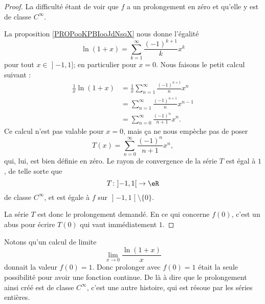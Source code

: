 \begin{proof}
	La difficulté étant de voir que \( f\) a un prolongement en zéro et qu'elle y est de classe \(  C^{\infty}\).

	La proposition \ref{PROPooKPBIooJdNsqX} nous donne l'égalité
	\begin{equation}
		\ln(1+x)=\sum_{k=1}^{\infty}\frac{ (-1)^{k+1} }{ k }x^k
	\end{equation}
	pour tout \( x\in \mathopen] -1 , 1 \mathclose]\); en particulier pour \( x=0\). Nous faisons le petit calcul suivant :
	\begin{subequations}        \label{SUBEQooRLQOooEzNFDp}
		\begin{align}
			\frac{1}{ x }\ln(1+x) & = \frac{1}{ x }\sum_{n=1}^{\infty}\frac{ (-1)^{n+1} }{ n }x^n \\
			                      & =\sum_{n=1}^{\infty}\frac{ (-1)^{n+1} }{ n }x^{n-1}           \\
			                      & =\sum_{n=0}^{\infty}\frac{ (-1)^n }{ n+1 }x^n.
		\end{align}
	\end{subequations}
	Ce calcul n'est pas valable pour \( x=0\), mais ça ne nous empèche pas de poser
	\begin{equation}
		T(x)=\sum_{n=0}^{\infty}\frac{ (-1)^n }{ n+1 }x^n,
	\end{equation}
	qui, lui, est bien définie en zéro. Le rayon de convergence de la série \( T\) est égal à \( 1\), de telle sorte que
	\begin{equation}
		T\colon \mathopen] -1 , 1 \mathclose[\to \eR \\
	\end{equation}
	de classe \(  C^{\infty}\), et est égale à \( f\) sur \( \mathopen] -1 , 1 \mathclose[\setminus\{ 0 \}\).

	La série \( T\) est donc le prolongement demandé. En ce qui concerne \( f(0)\), c'est un abus pour écrire \( T(0)\) qui vaut immédiatement \( 1\).
\end{proof}

Notons qu'un calcul de limite
\begin{equation}
	\lim_{x\to 0} \frac{ \ln(1+x) }{ x }
\end{equation}
donnait la valeur \( f(0)=1\). Donc prolonger avec \( f(0)=1\) était la seule possibilité pour avoir une fonction continue. De là à dire que le prolongement ainsi créé est de classe \(  C^{\infty}\), c'est une autre histoire, qui est résoue par les séries entières.

